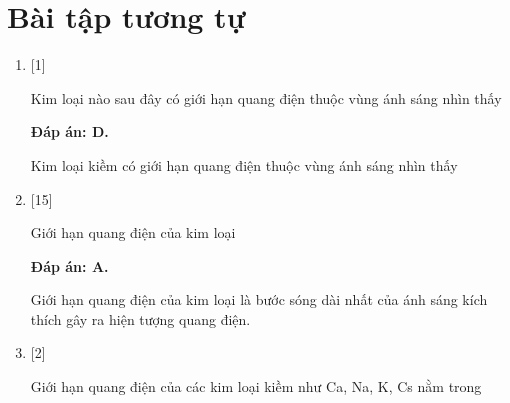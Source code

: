 \section{Bài tập tương tự}
\begin{enumerate}[label=\bfseries Câu \arabic*:]
	
	\item {} [1]
	\cauhoi
	{Kim loại nào sau đây có giới hạn quang điện thuộc vùng ánh sáng nhìn thấy
	}
	
	\loigiai
	{		\textbf{Đáp án: D.}
		
		Kim loại kiềm có giới hạn quang điện thuộc vùng ánh sáng nhìn thấy
	}
	
	\item {} [15]
	\cauhoi
	{Giới hạn quang điện của kim loại
	}
	
	\loigiai
	{		\textbf{Đáp án: A.}
		
		Giới hạn quang điện của kim loại là bước sóng dài nhất của ánh sáng kích thích gây ra hiện tượng quang điện. 
	}
	
	\item {} [2]
	\cauhoi
	{Giới hạn quang điện của các kim loại kiềm như Ca, Na, K, Cs nằm trong 
	}
	

\end{enumerate}
